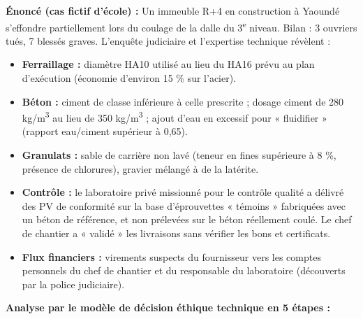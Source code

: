 \documentclass[11pt]{article}
\begin{document}
\begin{exoresolu}
\textbf{Énoncé (cas fictif d'école) :} Un immeuble R+4 en construction à Yaoundé s'effondre partiellement lors du coulage de la dalle du 3\textsuperscript{e} niveau. Bilan : 3 ouvriers tués, 7 blessés graves. L'enquête judiciaire et l'expertise technique révèlent :
\begin{itemize}
    \item \textbf{Ferraillage :} diamètre HA10 utilisé au lieu du HA16 prévu au plan d'exécution (économie d'environ 15 \% sur l'acier).
    \item \textbf{Béton :} ciment de classe inférieure à celle prescrite ; dosage ciment de 280 kg/m\textsuperscript{3} au lieu de 350 kg/m\textsuperscript{3} ; ajout d'eau en excessif pour « fluidifier » (rapport eau/ciment supérieur à 0,65).
    \item \textbf{Granulats :} sable de carrière non lavé (teneur en fines supérieure à 8 \%, présence de chlorures), gravier mélangé à de la latérite.
    \item \textbf{Contrôle :} le laboratoire privé missionné pour le contrôle qualité a délivré des PV de conformité sur la base d'éprouvettes « témoins » fabriquées avec un béton de référence, et non prélevées sur le béton réellement coulé. Le chef de chantier a « validé » les livraisons sans vérifier les bons et certificats.
    \item \textbf{Flux financiers :} virements suspects du fournisseur vers les comptes personnels du chef de chantier et du responsable du laboratoire (découverts par la police judiciaire).
\end{itemize}

\textbf{Analyse par le modèle de décision éthique technique en 5 étapes :}


\end{exoresolu}
\end{document}

